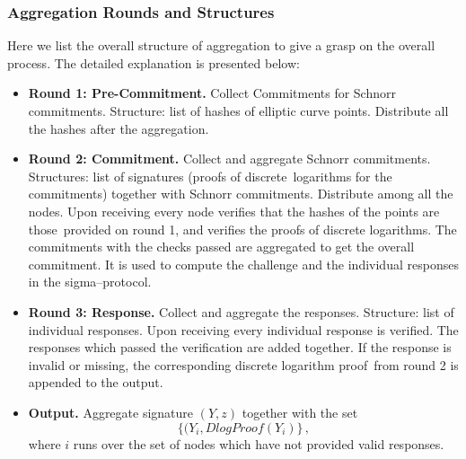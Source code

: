 \subsubsection{Aggregation Rounds and Structures}
Here we list the overall structure of aggregation to give a grasp on the overall process.
The detailed explanation is presented below:
\begin{itemize}
    \item [] \textbf{Round 1: Pre-Commitment.} Collect Commitments for Schnorr commitments.
    Structure: list of hashes of elliptic curve points.
    Distribute all the hashes after the aggregation.
    \item [] \textbf{Round 2: Commitment.} Collect and aggregate Schnorr commitments.
    Structures: list of signatures (proofs of discrete\
    logarithms for the commitments) together with Schnorr commitments.
    Distribute among all the nodes.
    Upon receiving every node verifies that the hashes of the points are those\
    provided on round 1, and verifies the proofs of discrete logarithms.
    The commitments with the checks passed are aggregated to get the overall commitment.
    It is used to compute the challenge and the individual responses in
    the sigma--protocol.
    \item [] \textbf{Round 3: Response.} Collect and aggregate the responses.
    Structure: list of individual responses.
    Upon receiving every individual response is verified.
    The responses which passed the verification are added together.
    If the response is invalid or missing, the corresponding discrete logarithm proof\
    from round 2 is appended to the output.

    \item [] \textbf{Output.} Aggregate signature $(Y,z)$ together with the set\
    \[
        \{(Y_i, DlogProof(Y_i)\}\,,
    \]
    where $i$ runs over the set of nodes which have not provided valid responses.
\end{itemize}

